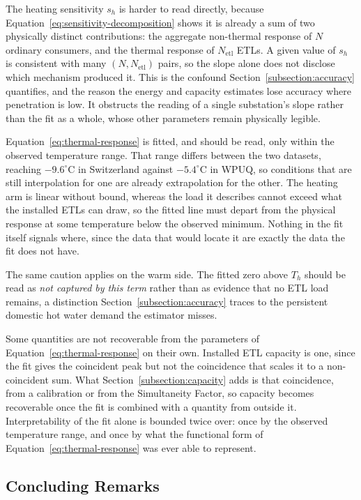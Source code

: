 \documentclass[9pt,journal,a4]{IEEEtran}
\begin{document}
The heating sensitivity $s_h$ is harder to read directly, because Equation~\eqref{eq:sensitivity-decomposition} shows it is already a sum of two physically distinct contributions: the aggregate non-thermal response of $N$ ordinary consumers, and the thermal response of $N_{\mathrm{etl}}$ ETLs. A given value of $s_h$ is consistent with many $(N, N_{\mathrm{etl}})$ pairs, so the slope alone does not disclose which mechanism produced it. This is the confound Section~\ref{subsection:accuracy} quantifies, and the reason the energy and capacity estimates lose accuracy where penetration is low. It obstructs the reading of a single substation's slope rather than the fit as a whole, whose other parameters remain physically legible.

Equation~\eqref{eq:thermal-response} is fitted, and should be read, only within the observed temperature range. That range differs between the two datasets, reaching $-9.6^\circ$C in Switzerland against $-5.4^\circ$C in WPUQ, so conditions that are still interpolation for one are already extrapolation for the other. The heating arm is linear without bound, whereas the load it describes cannot exceed what the installed ETLs can draw, so the fitted line must depart from the physical response at some temperature below the observed minimum. Nothing in the fit itself signals where, since the data that would locate it are exactly the data the fit does not have.

The same caution applies on the warm side. The fitted zero above $T_h$ should be read as \emph{not captured by this term} rather than as evidence that no ETL load remains, a distinction Section~\ref{subsection:accuracy} traces to the persistent domestic hot water demand the estimator misses.

Some quantities are not recoverable from the parameters of Equation~\eqref{eq:thermal-response} on their own. Installed ETL capacity is one, since the fit gives the coincident peak but not the coincidence that scales it to a non-coincident sum. What Section~\ref{subsection:capacity} adds is that coincidence, from a calibration or from the Simultaneity Factor, so capacity becomes recoverable once the fit is combined with a quantity from outside it. Interpretability of the fit alone is bounded twice over: once by the observed temperature range, and once by what the functional form of Equation~\eqref{eq:thermal-response} was ever able to represent.


\subsection{Concluding Remarks}
\end{document}
